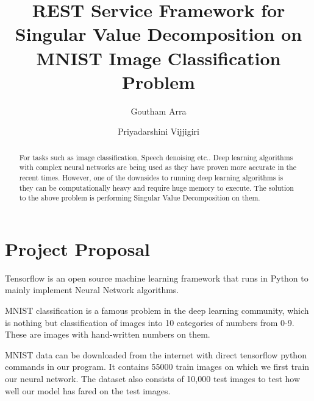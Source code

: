 
\title{REST Service Framework for Singular Value Decomposition on MNIST Image Classification Problem}

\author{Goutham Arra}

\author{Priyadarshini Vijjigiri}

\renewcommand{\shortauthors}{G. v. Laszewski}


\begin{abstract} 
For tasks such as image classification, Speech denoising etc..
Deep learning algorithms with complex  neural networks are being used as they
have proven more accurate in the recent  times. However, one of the downsides to
running deep learning algorithms is they can be computationally heavy and
require huge memory to execute. The solution to  the above problem is performing
Singular Value Decomposition on them.


\end{abstract}



\maketitle

\section{Project Proposal}

Tensorflow is an open source machine learning framework that runs in Python to 
mainly implement Neural Network algorithms. 

MNIST classification is a famous problem in the deep learning community, which
is  nothing but classification of images into 10 categories of numbers from 0-9.
These are images with hand-written numbers on them.

MNIST data can be downloaded from the internet with direct tensorflow python
commands in our program. It contains 55000 train images on which we first train 
our neural network. The dataset also consists of 10,000 test images to test
how well our model has fared on the test images.

